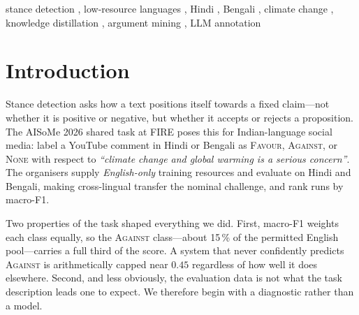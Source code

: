 \documentclass[twocolumn]{ceurart}
\begin{document}
\begin{keywords}
  stance detection \sep
  low-resource languages \sep
  Hindi \sep
  Bengali \sep
  climate change \sep
  knowledge distillation \sep
  argument mining \sep
  LLM annotation
\end{keywords}

\maketitle

\section{Introduction}

Stance detection asks how a text positions itself towards a fixed
claim---not whether it is positive or negative, but whether it accepts or
rejects a proposition. The AISoMe 2026 shared task at FIRE poses this for
Indian-language social media: label a YouTube comment in Hindi or Bengali as
\textsc{Favour}, \textsc{Against}, or \textsc{None} with respect to
\emph{``climate change and global warming is a serious concern''}. The
organisers supply \emph{English-only} training resources and evaluate on
Hindi and Bengali, making cross-lingual transfer the nominal challenge, and
rank runs by macro-F1.

Two properties of the task shaped everything we did. First, macro-F1 weights
each class equally, so the \textsc{Against} class---about 15\,\% of the
permitted English pool---carries a full third of the score. A system that
never confidently predicts \textsc{Against} is arithmetically capped near
$0.45$ regardless of how well it does elsewhere. Second, and less obviously,
the evaluation data is not what the task description leads one to expect. We
therefore begin with a diagnostic rather than a model.
\end{document}
